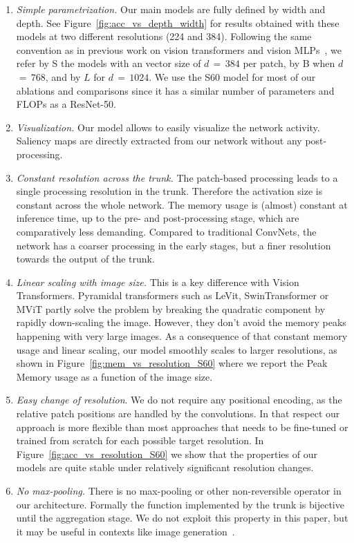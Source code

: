 \begin{enumerate}
\item \emph{Simple parametrization.} Our main models are fully defined by width and depth. %
See Figure~\ref{fig:acc_vs_depth_width} for results obtained with these models at two different resolutions (224 and 384). 
Following the same convention as in previous work on vision transformers and vision MLPs~\cite{dosovitskiy2020image,Touvron2020TrainingDI,Touvron2021ResMLPFN}, we refer by S the models with an vector size of $d$\,$=$\,$384$ per patch, by B when $d$\,$=$\,$768$, and by $L$ for $d$\,$=$\,$1024$. 
We use the S60 model for most of our ablations and comparisons since it has a similar number of parameters and FLOPs as a ResNet-50. 

\item \emph{Visualization.} 
Our model allows to easily visualize the network activity. 
Saliency maps are directly extracted from our network without any post-processing. 

\item \emph{Constant resolution across the trunk.} 
The patch-based processing leads to a single processing resolution in the trunk. 
Therefore the activation size is constant across the whole network. 
The memory usage is (almost) constant at inference time, up to the pre- and post-processing stage, which are comparatively less demanding. 
Compared to traditional ConvNets, the network has a coarser processing in the early stages, but a finer resolution towards the output of the trunk. 

\item \emph{Linear scaling with image size.} 
This is a key difference with Vision Transformers. 
Pyramidal transformers such as LeVit, SwinTransformer or MViT partly solve the problem by breaking the quadratic component by rapidly down-scaling the image. 
However, they don't avoid the memory peaks happening with very large images. 
%
As a consequence of that constant memory usage and linear scaling, our model smoothly scales to larger resolutions, as shown in Figure~\ref{fig:mem_vs_resolution_S60} where we report the Peak Memory usage as a function of the image size.

\item \emph{Easy change of resolution}. 
We do not require any positional encoding, as the relative patch positions are handled by the convolutions. 
%
In that respect our approach is more flexible than most approaches that needs to be fine-tuned or trained from scratch for each possible target resolution. 
In Figure~\ref{fig:acc_vs_resolution_S60} we show that the properties of our models are quite stable under relatively significant resolution changes. 

% 
\item \emph{No max-pooling.} 
There is no max-pooling or other non-reversible operator in our architecture. 
Formally the function implemented by the trunk is bijective until the aggregation stage. 
We do not exploit this property in this paper, but it may be useful in contexts like image generation~\cite{Donahue2019LargeSA,Kingma2018GlowGF}. 

%
\end{enumerate}
